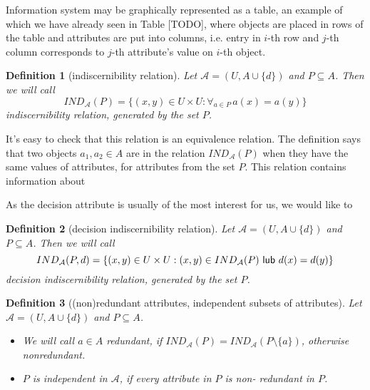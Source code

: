 \documentclass[12pt]{pracamgr}
\newtheorem{definition}{Definition}[chapter]
\begin{document}
Information system may be graphically represented as a table, an example of which we have 
already seen in Table [TODO], where objects are placed in rows of the table and 
attributes are put into columns, i.e. entry in $i$-th row and $j$-th column corresponds
to $j$-th attribute's value on $i$-th object.

\begin{definition}[indiscernibility relation]

  Let $\mathcal{A} = (U, A \cup \{d\})$  and $P \subseteq A$. Then we will call
  $$
    IND_\mathcal{A}(P) = \{(x, y) \in U \times U : \forall_{a \in P} \, a(x) = a(y) \}
  $$
  \emph{indiscernibility relation, generated by the set $P$}.

\end{definition}

It's easy to check that this relation is an equivalence relation. The definition says that
two objects $a_1, a_2 \in A$ are in the relation $IND_\mathcal{A}(P)$ when they have the
same values of attributes, for attributes from the set $P$. This relation contains
information about 

As the decision attribute is usually of the most interest for us, we would like to 

\begin{definition}[decision indiscernibility relation]

  Let $\mathcal{A} = (U, A \cup \{d\})$  and $P \subseteq A$. Then we will call
  $$
    IND_\mathcal{A}(P, d) = \{(x, y) \in U \times U : (x,y) \in IND_\mathcal{A}(P)\\
    \textsf{ lub } d(x) = d(y)\}
  $$
  \emph{decision} indiscernibility relation, generated by the set $P$.

\end{definition}

\begin{definition}[(non)redundant attributes, independent subsets of attributes]

  Let $\mathcal{A} = (U, A \cup \{d\})$  and $P \subseteq A$.
  \begin{itemize}
    \item We will call $a \in A$ \emph{redundant}, if 
    $IND_\mathcal{A}(P) = IND_\mathcal{A}(P \setminus\{a\})$, otherwise \emph{nonredundant}.
    \item $P$ is \emph{independent} in $\mathcal{A}$, if every attribute in $P$ is non-
    redundant in $P$.
  \end{itemize}

\end{definition}
\end{document}
